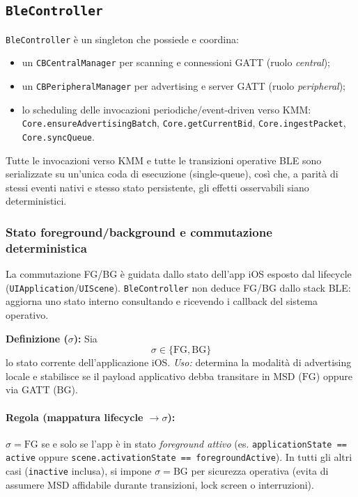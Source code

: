 \documentclass[a4paper,11pt,table,dvipsnames]{article}
\begin{document}
\subsection{\texttt{BleController}}
\texttt{BleController} è un singleton che possiede e coordina:
\begin{itemize}[nosep]
    \item un \texttt{CBCentralManager} per scanning e connessioni GATT (ruolo \emph{central});
    \item un \texttt{CBPeripheralManager} per advertising e server GATT (ruolo \emph{peripheral});
    \item lo scheduling delle invocazioni periodiche/event-driven verso KMM:
          \\ \texttt{Core.ensureAdvertisingBatch}, \texttt{Core.getCurrentBid}, \texttt{Core.ingestPacket}, \\ \texttt{Core.syncQueue}.
\end{itemize}
Tutte le invocazioni verso KMM e tutte le transizioni operative BLE sono serializzate su un’unica coda di esecuzione (single-queue), così che, a parità di stessi eventi nativi e stesso stato persistente, gli effetti osservabili siano deterministici.

\subsubsection{Stato foreground/background e commutazione deterministica}
La commutazione FG/BG è guidata dallo stato dell’app iOS esposto dal lifecycle (\texttt{UIApplication}/\texttt{UIScene}).
\texttt{BleController} non deduce FG/BG dallo stack BLE: aggiorna uno stato interno consultando e ricevendo i callback del sistema operativo.

\textbf{Definizione (\(\sigma\)):}
Sia
\[
    \sigma \in \{\mathrm{FG}, \mathrm{BG}\}
\]
lo stato corrente dell’applicazione iOS.
\emph{Uso:} determina la modalità di advertising locale e stabilisce se il payload applicativo debba transitare in MSD (\(\mathrm{FG}\)) oppure via GATT (\(\mathrm{BG}\)).

\paragraph{Regola (mappatura lifecycle \(\to \sigma\)):}
\(\sigma=\mathrm{FG}\) se e solo se l’app è in stato \emph{foreground attivo} (es. \texttt{applicationState == active} oppure \texttt{scene.activationState == foregroundActive}). In tutti gli altri casi (\texttt{inactive} inclusa), si impone \(\sigma=\mathrm{BG}\) per sicurezza operativa (evita di assumere MSD affidabile durante transizioni, lock screen o interruzioni).
\end{document}
